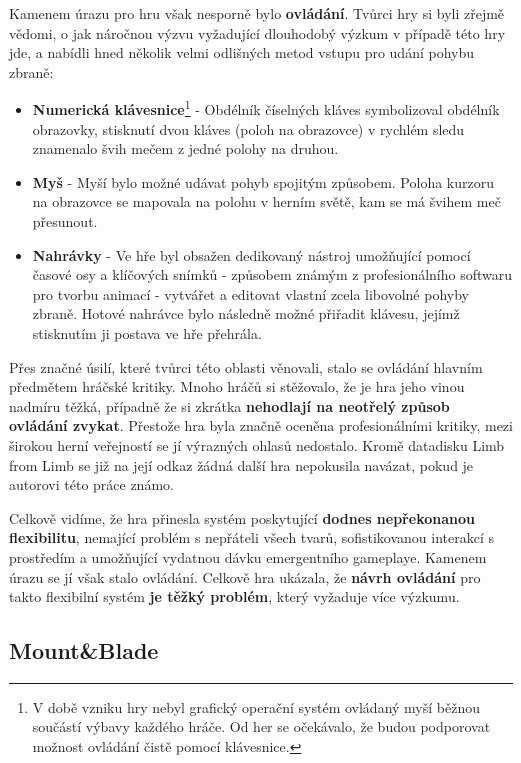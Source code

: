 Kamenem úrazu pro hru však nesporně bylo \textbf{ovládání}. Tvůrci hry si byli zřejmě vědomi, o jak náročnou výzvu vyžadující dlouhodobý výzkum v případě této hry jde, a nabídli hned několik velmi odlišných metod vstupu pro udání pohybu zbraně:
\begin{itemize}
    \item \textbf{Numerická klávesnice}\footnote{V době vzniku hry nebyl grafický operační systém ovládaný myší běžnou součástí výbavy každého hráče. Od her se očekávalo, že budou podporovat možnost ovládání čistě pomocí klávesnice.} - Obdélník číselných kláves symbolizoval obdélník obrazovky, stisknutí dvou kláves (poloh na obrazovce) v rychlém sledu znamenalo švih mečem z jedné polohy na druhou.
    \item \textbf{Myš} - Myší bylo možné udávat pohyb spojitým způsobem. Poloha kurzoru na obrazovce se mapovala na polohu v herním světě, kam se má švihem meč přesunout. 
    \item \textbf{Nahrávky} - Ve hře byl obsažen dedikovaný nástroj umožňující pomocí časové osy a klíčových snímků - způsobem známým z profesionálního softwaru pro tvorbu animací - vytvářet a editovat vlastní zcela libovolné pohyby zbraně. Hotové nahrávce bylo následně možné přiřadit klávesu, jejímž stisknutím ji postava ve hře přehrála. 
\end{itemize}   
Přes značné úsilí, které tvůrci této oblasti věnovali, stalo se ovládání hlavním předmětem hráčské kritiky. Mnoho hráčů si stěžovalo, že je hra jeho vinou nadmíru těžká, případně že si zkrátka \textbf{nehodlají na neotřelý způsob ovládání zvykat}. Přestože hra byla značně oceněna profesionálními kritiky, mezi širokou herní veřejností se jí výrazných ohlasů nedostalo. Kromě datadisku Limb from Limb se již na její odkaz žádná další hra nepokusila navázat, pokud je autorovi této práce známo.

\bigbreak
Celkově vidíme, že hra přinesla systém poskytující \textbf{dodnes nepřekonanou flexibilitu}, nemající problém s nepřáteli všech tvarů, sofistikovanou interakcí s prostředím a umožňující vydatnou dávku emergentního gameplaye. Kamenem úrazu se jí však stalo ovládání. Celkově hra ukázala, že \textbf{návrh ovládání} pro takto flexibilní systém \textbf{je těžký problém}, který vyžaduje více výzkumu.

\subsection{Mount\&Blade}

